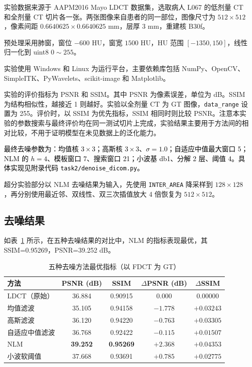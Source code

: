 \documentclass[10.5pt,compsoc,UTF8]{CjC}
\newcommand{\added}[1]{\textcolor{black}{#1}}
\theoremstyle{mystyle}
\begin{document}
实验数据来源于 AAPM2016 Mayo LDCT 数据集，选取病人 L067 的低剂量 CT 和全剂量 CT 切片各一张。两张图像来自患者的同一部位，图像尺寸为 $512\times512$，像素间距 $0.6640625\times0.6640625$ mm，层厚 3 mm，重建核 B30f。

预处理采用肺窗，窗位 $-600$ HU，窗宽 $1500$ HU，HU 范围 $[-1350, 150]$，线性归一化到 uint8 $0\sim255$。

实验使用 Windows 和 Linux 为运行平台，主要依赖库包括 NumPy、OpenCV、SimpleITK、PyWavelets、scikit-image 和 Matplotlib。

实验的评价指标为 PSNR 和 SSIM。其中 PSNR 为像素误差，单位为 dB。SSIM 为结构相似性，越接近 1 则越好。实验以全剂量 CT 为 GT 图像，\texttt{data\_range} 设置为 255。评价时，以 SSIM 为优先指标，SSIM 相同时则比较 PSNR。注意本实验的参数搜索与最终评价均在同一测试切片上完成，实验结果主要用于方法间的相对比较，不用于证明模型在未见数据上的泛化能力。

\added{最终去噪参数为：均值核 \(3\times3\)；高斯核 \(3\times3\)、\(\sigma=1.0\)；自适应中值最大窗口 5；NLM 的 \(h=4\)、模板窗口 7、搜索窗口 21；小波基 db1、分解 2 层、阈值 4。具体实现见附录代码 \texttt{task2/denoise\_dicom.py}。}

超分实验部分以 NLM 去噪结果为输入，先使用 \texttt{INTER\_AREA} 降采样到 $128\times128$，再分别使用最近邻、双线性、双三次插值放大 4 倍恢复为 $512\times512$。

\subsection{去噪结果}

如表~\ref{tab:denoising} 所示，在五种去噪结果的对比中，NLM 的指标表现最优，其 SSIM=0.95269，PSNR=39.252 dB。

\begin{table}[!ht]
\centering
\caption{五种去噪方法最优指标（以 FDCT 为 GT）}
\label{tab:denoising}
\begin{tabular}{lcccc}
\toprule
方法 & PSNR (dB) & SSIM & $\Delta$PSNR (dB) & $\Delta$SSIM \\
\midrule
LDCT（原始） & 36.884 & 0.90915 & 0.000 & 0.00000 \\
均值滤波 & 35.105 & 0.94158 & $-1.778$ & $+0.03243$ \\
高斯滤波 & 36.120 & 0.94220 & $-0.763$ & $+0.03305$ \\
自适应中值滤波 & 36.768 & 0.92422 & $-0.115$ & $+0.01507$ \\
NLM & \textbf{39.252} & \textbf{0.95269} & $+2.368$ & $+0.04353$ \\
小波软阈值 & 37.668 & 0.93691 & $+0.785$ & $+0.02775$ \\
\bottomrule
\end{tabular}
\end{table}
\end{document}
